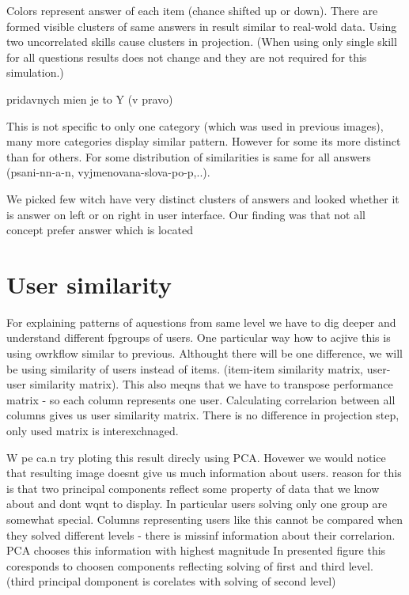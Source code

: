 \documentclass[
  digital, %
  table,   %
  nolof,     %
  nolot,     %
  nocover
]{fithesis3}
\begin{document}

Colors represent answer of each item (chance shifted up or down). There
are formed visible clusters of same answers in result similar to
real-wold data. Using two uncorrelated skills cause clusters in
projection. (When using only single skill for all questions results does
not change and they are not required for this simulation.)

pridavnych mien je to Y (v pravo)

This is not specific to only one category (which was used in previous
images), many more categories display similar pattern. However for some
its more distinct than for others. For some distribution of similarities
is same for all answers (psani-nn-a-n, vyjmenovana-slova-po-p,..).

We picked few witch have very distinct clusters of answers and looked whether it is
answer on left or on right in user interface. Our finding was that not all concept prefer answer which is  located


\section{User similarity}\label{user-similarity}


For explaining patterns of aquestions from same level we have to dig
deeper and understand different fpgroups of users. One particular way
how to acjive this is using owrkflow similar to previous. Althought
there will be one difference, we will be using similarity of users
instead of items. (item-item similarity matrix, user-user similarity
matrix). This also meqns that we have to transpose performance matrix -
so each column represents one user. Calculating correlarion between all
columns gives us user similarity matrix. There is no difference in
projection step, only used matrix is interexchnaged.

W pe ca.n try ploting this result direcly using PCA. Hovewer we would
notice that resulting image doesnt give us much information about users.
reason for this is that two principal components reflect some property
of data that we know about and dont wqnt to display. In particular users
solving only one group are somewhat special. Columns representing users
like this cannot be compared when they solved different levels - there
is missinf information about their correlarion. PCA chooses this
information with highest magnitude In presented figure this coresponds
to choosen components reflecting solving of first and third level.
(third principal domponent is corelates with solving of second level)
\end{document}
